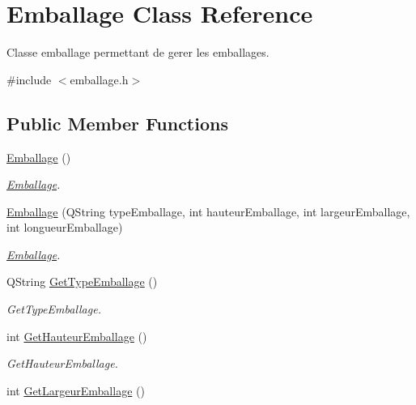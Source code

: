 \hypertarget{class_emballage}{}\section{Emballage Class Reference}
\label{class_emballage}


Classe emballage permettant de gerer les emballages.  




{\ttfamily \#include $<$emballage.\+h$>$}

\subsection*{Public Member Functions}
\begin{DoxyCompactItemize}
\item 
\mbox{\label{class_emballage_ab800d6046cc44752ea9b769a6803a18a}} 
\mbox{\hyperlink{class_emballage_ab800d6046cc44752ea9b769a6803a18a}{Emballage}} ()
\begin{DoxyCompactList}\small\item\em \mbox{\hyperlink{class_emballage}{Emballage}}. \end{DoxyCompactList}\item 
\mbox{\hyperlink{class_emballage_ae74a1117a30e239442418bb49a69db47}{Emballage}} (Q\+String type\+Emballage, int hauteur\+Emballage, int largeur\+Emballage, int longueur\+Emballage)
\begin{DoxyCompactList}\small\item\em \mbox{\hyperlink{class_emballage}{Emballage}}. \end{DoxyCompactList}\item 
Q\+String \mbox{\hyperlink{class_emballage_a5662f2d4aae61a7c999a4d26dd82fa14}{Get\+Type\+Emballage}} ()
\begin{DoxyCompactList}\small\item\em Get\+Type\+Emballage. \end{DoxyCompactList}\item 
int \mbox{\hyperlink{class_emballage_a8face654d3e58ac8137c6cffa5d7506e}{Get\+Hauteur\+Emballage}} ()
\begin{DoxyCompactList}\small\item\em Get\+Hauteur\+Emballage. \end{DoxyCompactList}\item 
int \mbox{\hyperlink{class_emballage_aef2c90e75a4a1dd31f733561f50a3569}{Get\+Largeur\+Emballage}} ()

\end{DoxyCompactItemize}
